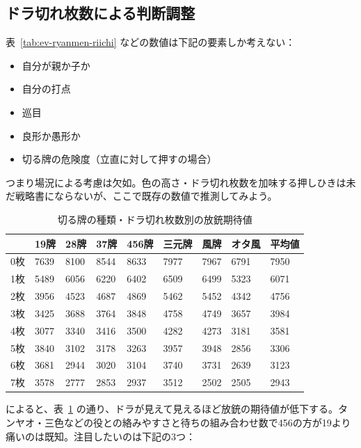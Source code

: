 \documentclass[10pt, twocolumn, notitlepage]{report}
\begin{document}
\subsection{ドラ切れ枚数による判断調整}

表~\ref{tab:ev-ryanmen-riichi} などの数値は下記の要素しか考えない：

\begin{itemize}
\item 自分が親か子か
\item 自分の打点
\item 巡目
\item 良形か愚形か
\item 切る牌の危険度（立直に対して押すの場合）
\end{itemize}

つまり場況による考慮は欠如。色の高さ・ドラ切れ枚数を加味する押しひきは未だ戦略書にならないが、ここで既存の数値で推測してみよう。

\begin{table}[t]
  \centering
  \begin{tabular}{l|lllllll|l}
        & 19牌 & 28牌 & 37牌 & 456牌 & 三元牌 & 風牌 & オタ風 & 平均値 \\
    \hline
    0枚 & 7639 & 8100 & 8544 & 8633 & 7977 & 7967 & 6791 & 7950 \\
    1枚 & 5489 & 6056 & 6220 & 6402 & 6509 & 6499 & 5323 & 6071 \\
    2枚 & 3956 & 4523 & 4687 & 4869 & 5462 & 5452 & 4342 & 4756 \\
    3枚 & 3425 & 3688 & 3764 & 3848 & 4758 & 4749 & 3657 & 3984 \\
    4枚 & 3077 & 3340 & 3416 & 3500 & 4282 & 4273 & 3181 & 3581 \\
    5枚 & 3840 & 3102 & 3178 & 3263 & 3957 & 3948 & 2856 & 3306 \\
    6枚 & 3681 & 2944 & 3020 & 3104 & 3740 & 3731 & 2639 & 3123 \\
    7枚 & 3578 & 2777 & 2853 & 2937 & 3512 & 2502 & 2505 & 2943
  \end{tabular}
  \caption{切る牌の種類・ドラ切れ枚数別の放銃期待値\citep{ktrpry}}
  \label{tab:ev-dora-cut}
\end{table}

\citet{ktrpry}によると、表~\ref{tab:ev-dora-cut} の通り、ドラが見えて見えるほど放銃の期待値が低下する。タンヤオ・三色などの役との絡みやすさと待ちの組み合わせ数で456の方が19より痛いのは既知。注目したいのは下記の3つ：
\end{document}
